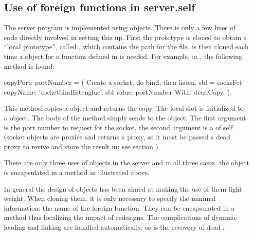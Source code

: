 \documentclass[letterpaper,10pt,english]{sphinxmanual}
\begin{document}
\subsection{Use of foreign functions in server.self}
\label{\detokenize{vmref:use-of-foreign-functions-in-server-self}}
The server program is implemented using  objects. There is only a few lines of code
directly involved in setting this up. First the  prototype is cloned to obtain a “local
prototype”, called , which contains the path for the  file.  is then
cloned each time a  object for a function defined in  is needed. For example,
in , the following method is found:

\begin{sphinxVerbatim}[commandchars=\\\{\}]
copyPort: portNumber = ( \PYGZdq{}Create a socket, do bind, then listen.\PYGZdq{}
        \textbar{} sbl = socksFct copyName: ’socket\PYGZus{}bind\PYGZus{}listen\PYGZus{}glue’. \textbar{}
        sbl value: portNumber With: deadCopy.
    ).
\end{sphinxVerbatim}

This method copies a  object and returns the copy. The local slot  is initialized to a
 object. The body of the method simply sends  to the 
object. The first argument is the port number to request for the socket, the second argument is a
 of self (socket objects are proxies and  returns a proxy, so it
must be passed a dead proxy to revive and store the result in; see section {\hyperref[\detokenize{vmref:proxy-and-fctproxy-objects}]{}}).

There are only three uses of  objects in the server and in all three cases, the 
object is encapsulated in a method as illustrated above.

In general the design of  objects has been aimed at making the use of them light
weight. When cloning them, it is only necessary to specify the minimal information: the name of
the foreign function. They can be encapsulated in a method thus localizing the impact of redesigns.
The complications of dynamic loading and linking are handled automatically, as is the recovery of
dead .
\end{document}
